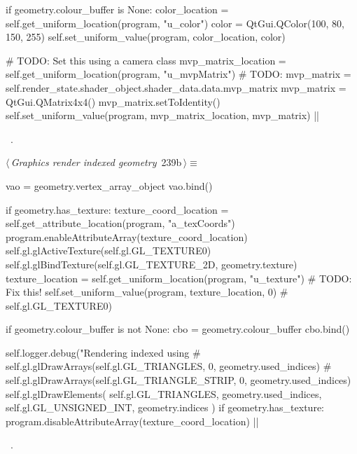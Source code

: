 \documentclass[%
    a4paper,    %
    justified,  %
    nobib,      %
    openany     %
]{tufte-book}
\makeatletter
\renewcommand{\label}[1]{\@tufte@label{##1}}%
\makeatother
\begin{document}
\begin{fullwidth}
\begin{flushleft}
\begin{minipage}{\linewidth}
\begin{pythoncode}
if geometry.colour_buffer is None:
    color_location = self.get_uniform_location(program, "u_color")
    color = QtGui.QColor(100, 80, 150, 255)
    self.set_uniform_value(program, color_location, color)

# TODO: Set this using a camera class
mvp_matrix_location = self.get_uniform_location(program, "u_mvpMatrix")
# TODO: mvp_matrix = self.render_state.shader_object.shader_data.data.mvp_matrix
mvp_matrix = QtGui.QMatrix4x4()
mvp_matrix.setToIdentity()
self.set_uniform_value(program, mvp_matrix_location, mvp_matrix)
|\NWsep|
\end{pythoncode}
\vspace{1.5ex}
\footnotesize
\begin{list}{}{\setlength{\itemsep}{-\parsep}\setlength{\itemindent}{-\leftmargin}}
\item \NWtxtMacroRefIn\ .

\item{}
\end{list}
\end{minipage}\vspace{4ex}
\end{flushleft}
\begin{flushleft} \small
\begin{minipage}{\linewidth}\label{scrap257}\raggedright\small
{} $\langle\,${\itshape Graphics render indexed geometry}\nobreak\ {\footnotesize {239b}}$\,\rangle\equiv$
\vspace{-1ex}
\begin{pythoncode}
vao = geometry.vertex_array_object
vao.bind()

if geometry.has_texture:
    texture_coord_location = self.get_attribute_location(program, "a_texCoords")
    program.enableAttributeArray(texture_coord_location)
    self.gl.glActiveTexture(self.gl.GL_TEXTURE0)
    self.gl.glBindTexture(self.gl.GL_TEXTURE_2D, geometry.texture)
    texture_location = self.get_uniform_location(program, "u_texture")
    # TODO: Fix this!
    self.set_uniform_value(program, texture_location, 0)  # self.gl.GL_TEXTURE0)

if geometry.colour_buffer is not None:
    cbo = geometry.colour_buffer
    cbo.bind()

self.logger.debug("Rendering indexed using %
# self.gl.glDrawArrays(self.gl.GL_TRIANGLES, 0, geometry.used_indices)
# self.gl.glDrawArrays(self.gl.GL_TRIANGLE_STRIP, 0, geometry.used_indices)
self.gl.glDrawElements(
    self.gl.GL_TRIANGLES,
    geometry.used_indices,
    self.gl.GL_UNSIGNED_INT,
    geometry.indices
)
if geometry.has_texture:
    program.disableAttributeArray(texture_coord_location)
|\NWsep|
\end{pythoncode}
\vspace{1.5ex}
\footnotesize
\begin{list}{}{\setlength{\itemsep}{-\parsep}\setlength{\itemindent}{-\leftmargin}}
\item \NWtxtMacroRefIn\ .


\end{list}
\end{minipage}
\end{flushleft}
\end{fullwidth}
\end{document}
